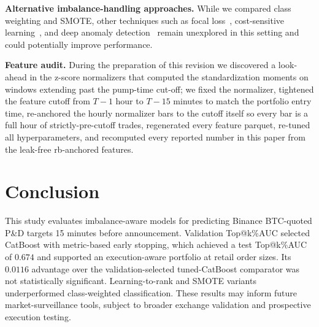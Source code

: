 \documentclass{ieeeaccess}
\begin{document}
\textbf{Alternative imbalance-handling approaches.}
While we compared class weighting and SMOTE, other techniques such as focal loss~\cite{lin2017focal}, cost-sensitive learning~\cite{elkan2001cost}, and deep anomaly detection~\cite{liu2008isolation} remain unexplored in this setting and could potentially improve performance.

\textbf{Feature audit.}
During the preparation of this revision we discovered a look-ahead in the z-score normalizers that computed the standardization moments on windows extending past the pump-time cut-off; we fixed the normalizer, tightened the feature cutoff from $T-1$ hour to $T-15$ minutes to match the portfolio entry time, re-anchored the hourly normalizer bars to the cutoff itself so every bar is a full hour of strictly-pre-cutoff trades, regenerated every feature parquet, re-tuned all hyperparameters, and recomputed every reported number in this paper from the leak-free rb-anchored features.


\section{Conclusion}

This study evaluates imbalance-aware models for predicting Binance BTC-quoted P\&D targets 15 minutes before announcement. Validation Top@k\%AUC selected CatBoost with metric-based early stopping, which achieved a test Top@k\%AUC of $0.674$ and supported an execution-aware portfolio at retail order sizes. Its $0.0116$ advantage over the validation-selected tuned-CatBoost comparator was not statistically significant. Learning-to-rank and SMOTE variants underperformed class-weighted classification. These results may inform future market-surveillance tools, subject to broader exchange validation and prospective execution testing.
\end{document}
